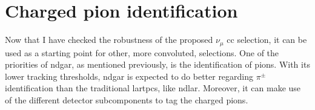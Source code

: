 \section{Charged pion identification}
\label{sec:gar_charged_pions}

Now that I have checked the robustness of the proposed $\nu_{\mu}$ \gls{cc} selection, it can be used as a starting point for other, more convoluted, selections. One of the priorities of \gls{ndgar}, as mentioned previously, is the identification of pions. With its lower tracking thresholds, \gls{ndgar} is expected to do better regarding $\pi^{\pm}$ identification than the traditional \gls{lartpc}s, like \gls{ndlar}. Moreover, it can make use of the different detector subcomponents to tag the charged pions.

